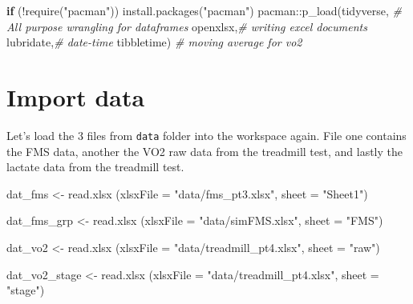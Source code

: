 \documentclass[
]{book}
\newenvironment{Shaded}{\begin{snugshade}}{\end{snugshade}}
\newcommand{\AttributeTok}[1]{\textcolor[rgb]{0.77,0.63,0.00}{#1}}
\newcommand{\CommentTok}[1]{\textcolor[rgb]{0.56,0.35,0.01}{\textit{#1}}}
\newcommand{\ControlFlowTok}[1]{\textcolor[rgb]{0.13,0.29,0.53}{\textbf{#1}}}
\newcommand{\FunctionTok}[1]{\textcolor[rgb]{0.00,0.00,0.00}{#1}}
\newcommand{\NormalTok}[1]{#1}
\newcommand{\OtherTok}[1]{\textcolor[rgb]{0.56,0.35,0.01}{#1}}
\newcommand{\SpecialCharTok}[1]{\textcolor[rgb]{0.00,0.00,0.00}{#1}}
\newcommand{\StringTok}[1]{\textcolor[rgb]{0.31,0.60,0.02}{#1}}
\begin{document}
\begin{Shaded}
\begin{Highlighting}[]
\ControlFlowTok{if}\NormalTok{ (}\SpecialCharTok{!}\FunctionTok{require}\NormalTok{(}\StringTok{"pacman"}\NormalTok{)) }\FunctionTok{install.packages}\NormalTok{(}\StringTok{"pacman"}\NormalTok{)}
\NormalTok{pacman}\SpecialCharTok{::}\FunctionTok{p\_load}\NormalTok{(tidyverse, }\CommentTok{\# All purpose wrangling for dataframes}
\NormalTok{               openxlsx,}\CommentTok{\# writing excel documents}
\NormalTok{               lubridate,}\CommentTok{\# date{-}time }
\NormalTok{               tibbletime) }\CommentTok{\# moving average for vo2}
\end{Highlighting}
\end{Shaded}

\hypertarget{import-data}{%
\section*{Import data}\label{import-data}}

Let's load the 3 files from \texttt{data} folder into the workspace again. File one contains the FMS data, another the VO2 raw data from the treadmill test, and lastly the lactate data from the treadmill test.

\begin{Shaded}
\begin{Highlighting}[]
\NormalTok{dat\_fms }\OtherTok{\textless{}{-}}  \FunctionTok{read.xlsx}\NormalTok{ (}\AttributeTok{xlsxFile =} \StringTok{"data/fms\_pt3.xlsx"}\NormalTok{,}
                   \AttributeTok{sheet =} \StringTok{"Sheet1"}\NormalTok{)}

\NormalTok{dat\_fms\_grp }\OtherTok{\textless{}{-}} \FunctionTok{read.xlsx}\NormalTok{ (}\AttributeTok{xlsxFile =} \StringTok{"data/simFMS.xlsx"}\NormalTok{,}
                   \AttributeTok{sheet =} \StringTok{"FMS"}\NormalTok{)}

\NormalTok{dat\_vo2 }\OtherTok{\textless{}{-}}  \FunctionTok{read.xlsx}\NormalTok{ (}\AttributeTok{xlsxFile =} \StringTok{"data/treadmill\_pt4.xlsx"}\NormalTok{,}
                   \AttributeTok{sheet =} \StringTok{"raw"}\NormalTok{)}

\NormalTok{dat\_vo2\_stage }\OtherTok{\textless{}{-}}  \FunctionTok{read.xlsx}\NormalTok{ (}\AttributeTok{xlsxFile =} \StringTok{"data/treadmill\_pt4.xlsx"}\NormalTok{,}
                   \AttributeTok{sheet =} \StringTok{"stage"}\NormalTok{)}
\end{Highlighting}
\end{Shaded}
\end{document}
